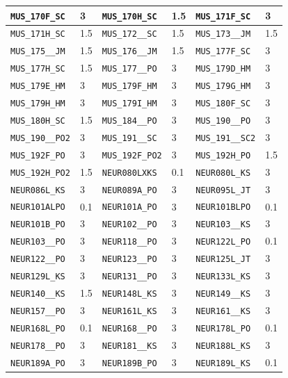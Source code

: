 \begin{longtable}{|l|l||l|l||l|l|}
    \verb|MUS_170F_SC| & 3 & \verb|MUS_170H_SC| & 1.5 & \verb|MUS_171F_SC| & 3\\\hline
    \verb|MUS_171H_SC| & 1.5 & \verb|MUS_172__SC| & 1.5 & \verb|MUS_173__JM| & 1.5\\\hline
    \verb|MUS_175__JM| & 1.5 & \verb|MUS_176__JM| & 1.5 & \verb|MUS_177F_SC| & 3\\\hline
    \verb|MUS_177H_SC| & 1.5 & \verb|MUS_177__PO| & 3 & \verb|MUS_179D_HM| & 3\\\hline
    \verb|MUS_179E_HM| & 3 & \verb|MUS_179F_HM| & 3 & \verb|MUS_179G_HM| & 3\\\hline
    \verb|MUS_179H_HM| & 3 & \verb|MUS_179I_HM| & 3 & \verb|MUS_180F_SC| & 3\\\hline
    \verb|MUS_180H_SC| & 1.5 & \verb|MUS_184__PO| & 3 & \verb|MUS_190__PO| & 3\\\hline
    \verb|MUS_190__PO2| & 3 & \verb|MUS_191__SC| & 3 & \verb|MUS_191__SC2| & 3\\\hline
    \verb|MUS_192F_PO| & 3 & \verb|MUS_192F_PO2| & 3 & \verb|MUS_192H_PO| & 1.5\\\hline
    \verb|MUS_192H_PO2| & 1.5 & \verb|NEUR080LXKS| & 0.1 & \verb|NEUR080L_KS| & 3\\\hline
    \verb|NEUR086L_KS| & 3 & \verb|NEUR089A_PO| & 3 & \verb|NEUR095L_JT| & 3\\\hline
    \verb|NEUR101ALPO| & 0.1 & \verb|NEUR101A_PO| & 3 & \verb|NEUR101BLPO| & 0.1\\\hline
    \verb|NEUR101B_PO| & 3 & \verb|NEUR102__PO| & 3 & \verb|NEUR103__KS| & 3\\\hline
    \verb|NEUR103__PO| & 3 & \verb|NEUR118__PO| & 3 & \verb|NEUR122L_PO| & 0.1\\\hline
    \verb|NEUR122__PO| & 3 & \verb|NEUR123__PO| & 3 & \verb|NEUR125L_JT| & 3\\\hline
    \verb|NEUR129L_KS| & 3 & \verb|NEUR131__PO| & 3 & \verb|NEUR133L_KS| & 3\\\hline
    \verb|NEUR140__KS| & 1.5 & \verb|NEUR148L_KS| & 3 & \verb|NEUR149__KS| & 3\\\hline
    \verb|NEUR157__PO| & 3 & \verb|NEUR161L_KS| & 3 & \verb|NEUR161__KS| & 3\\\hline
    \verb|NEUR168L_PO| & 0.1 & \verb|NEUR168__PO| & 3 & \verb|NEUR178L_PO| & 0.1\\\hline
    \verb|NEUR178__PO| & 3 & \verb|NEUR181__KS| & 3 & \verb|NEUR188L_KS| & 3\\\hline
    \verb|NEUR189A_PO| & 3 & \verb|NEUR189B_PO| & 3 & \verb|NEUR189L_KS| & 0.1\\\hline

\end{longtable}

